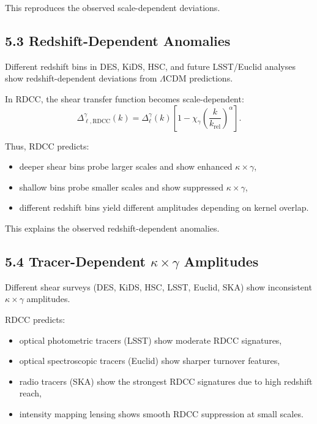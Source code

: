 \documentclass[11pt,a4paper]{article}
\begin{document}
This reproduces the observed scale-dependent deviations.

\subsection*{5.3 Redshift-Dependent Anomalies}

Different redshift bins in DES, KiDS, HSC, and future LSST/Euclid analyses show 
redshift-dependent deviations from $\Lambda$CDM predictions.

In RDCC, the shear transfer function becomes scale-dependent:
\begin{equation}
    \Delta_{\ell,\mathrm{RDCC}}^{\gamma}(k)
    = \Delta_{\ell}^{\gamma}(k)
      \left[
        1 - \chi_{\gamma}
        \left(\frac{k}{k_{\mathrm{rel}}}\right)^{\alpha}
      \right].
\end{equation}

Thus, RDCC predicts:

\begin{itemize}
    \item deeper shear bins probe larger scales and show enhanced $\kappa \times \gamma$,
    \item shallow bins probe smaller scales and show suppressed $\kappa \times \gamma$,
    \item different redshift bins yield different amplitudes depending on kernel overlap.
\end{itemize}

This explains the observed redshift-dependent anomalies.

\subsection*{5.4 Tracer-Dependent $\kappa \times \gamma$ Amplitudes}

Different shear surveys (DES, KiDS, HSC, LSST, Euclid, SKA) show inconsistent 
$\kappa \times \gamma$ amplitudes.

RDCC predicts:

\begin{itemize}
    \item optical photometric tracers (LSST) show moderate RDCC signatures,
    \item optical spectroscopic tracers (Euclid) show sharper turnover features,
    \item radio tracers (SKA) show the strongest RDCC signatures due to high redshift reach,
    \item intensity mapping lensing shows smooth RDCC suppression at small scales.
\end{itemize}
\end{document}
